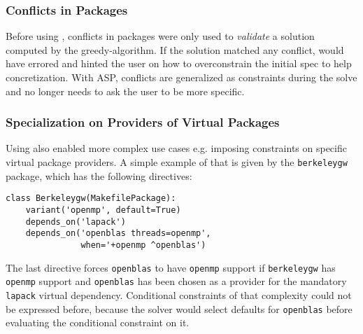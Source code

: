

\subsubsection{Conflicts in Packages}
Before using \clingo{}, conflicts in packages were only used to \emph{validate} a
solution computed by the greedy-algorithm. If the solution matched any conflict,
\spack{} would have errored and hinted the user on how to overconstrain the initial spec
to help concretization. With ASP, conflicts are generalized as constraints during the
solve\footnotemark{} and \spack{} no longer needs to ask the user to be more specific.

\subsubsection{Specialization on Providers of Virtual Packages}
Using \clingo{} also enabled more complex use cases e.g. imposing constraints on
specific virtual package providers. A simple example of that is given by the
{\tt berkeleygw} package, which has the following directives:

\begin{verbatim}
class Berkeleygw(MakefilePackage):
    variant('openmp', default=True)
    depends_on('lapack')
    depends_on('openblas threads=openmp',
               when='+openmp ^openblas')
\end{verbatim}

The last directive forces {\tt openblas} to have {\tt openmp} support if
{\tt berkeleygw} has {\tt openmp} support and {\tt openblas} has been chosen as
a provider for the mandatory {\tt lapack} virtual dependency. Conditional constraints
of that complexity could not be expressed before, because the solver would select
defaults for {\tt openblas} before evaluating the conditional constraint on it.

